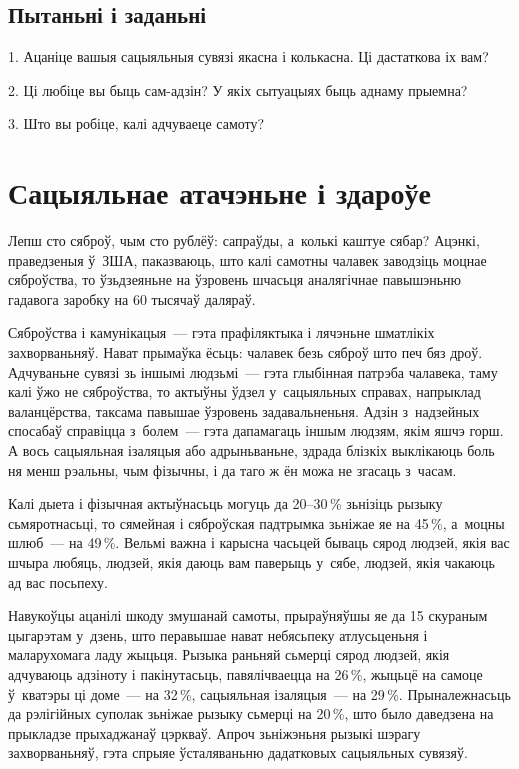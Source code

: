 \subsection*{Пытаньні і заданьні}

1. Ацаніце вашыя сацыяльныя сувязі якасна і колькасна. Ці дастаткова іх вам?

2. Ці любіце вы быць сам-адзін? У якіх сытуацыях быць аднаму прыемна?

3. Што вы робіце, калі адчуваеце самоту?


\section{Сацыяльнае атачэньне і здароўе}

Лепш сто сяброў, чым сто рублёў: сапраўды, а~колькі каштуе сябар? Ацэнкі, праведзеныя ў~ЗША, паказваюць, што калі самотны чалавек заводзіць моцнае сяброўства, то ўзьдзеяньне на ўзровень шчасьця аналягічнае павышэньню гадавога заробку на 60 тысячаў даляраў.

Сяброўства і камунікацыя~--- гэта прафіляктыка і лячэньне шматлікіх захворваньняў. Нават прымаўка ёсьць: чалавек безь сяброў што печ бяз дроў. Адчуваньне сувязі зь іншымі людзьмі~--- гэта глыбінная патрэба чалавека, таму калі ўжо не сяброўства, то актыўны ўдзел у~сацыяльных справах, напрыклад валанцёрства, таксама павышае ўзровень задавальненьня. Адзін з~надзейных спосабаў справіцца з~болем~--- гэта дапамагаць іншым людзям, якім яшчэ горш. А вось сацыяльная ізаляцыя або адрыньваньне, здрада блізкіх выклікаюць боль ня менш рэальны, чым фізычны, і да таго ж ён можа не згасаць з~часам.

Калі дыета і фізычная актыўнасьць могуць да 20--30\,\% зьнізіць рызыку сьмяротнасьці, то сямейная і сяброўская падтрымка зьніжае яе на 45\,\%, а~моцны шлюб~--- на 49\,\%. Вельмі важна і карысна часьцей бываць сярод людзей, якія вас шчыра любяць, людзей, якія даюць вам паверыць у~сябе, людзей, якія чакаюць ад вас посьпеху.

Навукоўцы ацанілі шкоду змушанай самоты, прыраўняўшы яе да 15 скураным цыгарэтам у~дзень, што перавышае нават небясьпеку атлусьценьня і маларухомага ладу жыцьця. Рызыка раньняй сьмерці сярод людзей, якія адчуваюць адзіноту і пакінутасьць, павялічваецца на 26\,\%, жыцьцё на самоце ў~кватэры ці доме~--- на 32\,\%, сацыяльная ізаляцыя~--- на 29\,\%. Прыналежнасьць да рэлігійных суполак зьніжае рызыку сьмерці на 20\,\%, што было даведзена на прыкладзе прыхаджанаў цэркваў. Апроч зьніжэньня рызыкі шэрагу захворваньняў, гэта спрыяе ўсталяваньню дадатковых сацыяльных сувязяў.

